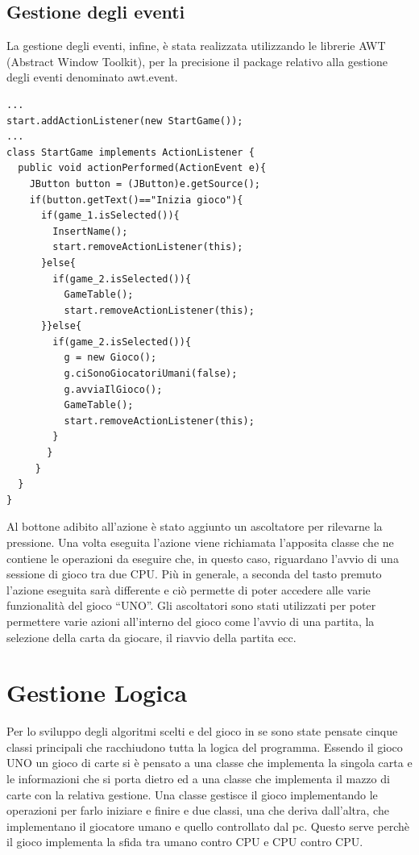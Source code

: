 	\subsection{Gestione degli eventi}
		La gestione degli eventi, infine, è stata realizzata utilizzando le librerie AWT (Abstract Window Toolkit), per la precisione il package relativo alla gestione degli eventi denominato awt.event. 
\begin{lstlisting}
...
start.addActionListener(new StartGame());
...
class StartGame implements ActionListener {		
  public void actionPerformed(ActionEvent e){
    JButton button = (JButton)e.getSource();
    if(button.getText()=="Inizia gioco"){
      if(game_1.isSelected()){
	    InsertName();
	    start.removeActionListener(this);
      }else{
	    if(game_2.isSelected()){
		  GameTable();
		  start.removeActionListener(this);
	  }}else{			
		if(game_2.isSelected()){
		  g = new Gioco();
		  g.ciSonoGiocatoriUmani(false);
		  g.avviaIlGioco();							
		  GameTable();
		  start.removeActionListener(this);
		}
	   }
     }
  }
}

\end{lstlisting}

	Al bottone adibito all'azione è stato aggiunto un ascoltatore per rilevarne la pressione. Una volta eseguita l'azione viene richiamata l'apposita classe che ne contiene le operazioni da eseguire che, in questo caso, riguardano l’avvio di una sessione di gioco tra due CPU. Più in generale, a seconda del tasto premuto l'azione eseguita sarà differente e ciò permette di poter accedere alle varie funzionalità del gioco “UNO”. Gli ascoltatori sono stati utilizzati per poter permettere varie azioni all’interno del gioco come l’avvio di una partita, la selezione della carta da giocare, il riavvio della partita ecc.	
		
\newpage
\section{Gestione Logica}		
	Per lo sviluppo degli algoritmi scelti e del gioco in se sono state pensate cinque classi principali che racchiudono tutta la logica del programma. Essendo il gioco UNO un gioco di carte si è pensato a una classe che implementa la singola carta e le informazioni che si porta dietro ed a una classe che implementa il mazzo di carte con la relativa gestione. Una classe gestisce il gioco implementando le operazioni per farlo iniziare e finire e due classi, una che deriva dall'altra, che implementano il giocatore umano e quello controllato dal pc. Questo serve perchè il gioco implementa la sfida tra umano contro CPU e CPU contro CPU.
	
